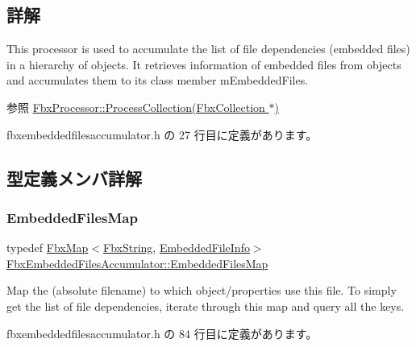 \subsection{詳解}
This processor is used to accumulate the list of file dependencies (embedded files) in a hierarchy of objects. It retrieves information of embedded files from objects and accumulates them to its class member m\+Embedded\+Files. \begin{DoxySeeAlso}{参照}
\hyperlink{class_fbx_processor_acb7f2a7c80e823b16d2639d7293fefb3}{Fbx\+Processor\+::\+Process\+Collection(\+Fbx\+Collection $\ast$)} 
\end{DoxySeeAlso}


 fbxembeddedfilesaccumulator.\+h の 27 行目に定義があります。



\subsection{型定義メンバ詳解}
\mbox{\label{class_fbx_embedded_files_accumulator_a7471092a2496b1e45a263f91ea3db731}} 
\subsubsection{\texorpdfstring{Embedded\+Files\+Map}{EmbeddedFilesMap}}
{\footnotesize\ttfamily typedef \hyperlink{class_fbx_map}{Fbx\+Map}$<$\hyperlink{class_fbx_string}{Fbx\+String}, \hyperlink{struct_fbx_embedded_files_accumulator_1_1_embedded_file_info}{Embedded\+File\+Info}$>$ \hyperlink{class_fbx_embedded_files_accumulator_a7471092a2496b1e45a263f91ea3db731}{Fbx\+Embedded\+Files\+Accumulator\+::\+Embedded\+Files\+Map}}

Map the (absolute filename) to which object/properties use this file. To simply get the list of file dependencies, iterate through this map and query all the keys. 

 fbxembeddedfilesaccumulator.\+h の 84 行目に定義があります。

\mbox{\label{class_fbx_embedded_files_accumulator_abc919e5ba3486530790dcd7ef90b8eed}} 
